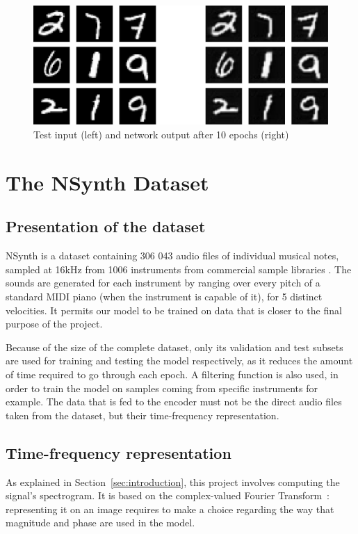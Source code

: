 \documentclass{article}
\begin{document}
\begin{figure}[ht]
    \centering
    \includegraphics[width=\columnwidth]{figs/MNIST_test.png}
    \caption{Test input (left) and network output after 10 epochs (right)}
    \label{fig:MNIST_test}
\end{figure}

\section{The NSynth Dataset}\label{sec:NSynth}
\subsection{Presentation of the dataset}
NSynth is a dataset containing 306 043 audio files of individual musical notes, sampled at 16kHz from 1006 instruments from commercial sample libraries \cite{NSynth}. The sounds are generated for each instrument by ranging over every pitch of a standard MIDI piano (when the instrument is capable of it), for 5 distinct velocities. It permits our model to be trained on data that is closer to the final purpose of the project. 

Because of the size of the complete dataset, only its validation and test subsets are used for training and testing the model respectively, as it reduces the amount of time required to go through each epoch. A filtering function is also used, in order to train the model on samples coming from specific instruments for example. The data that is fed to the encoder must not be the direct audio files taken from the dataset, but their time-frequency representation.

\subsection{Time-frequency representation}
As explained in Section~\ref{sec:introduction}, this project involves computing the signal's spectrogram. It is based on the complex-valued Fourier Transform~: representing it on an image requires to make a choice regarding the way that magnitude and phase are used in the model.
\end{document}
